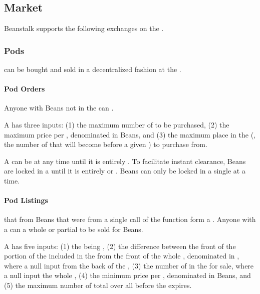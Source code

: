 \documentclass[class=article, crop=false]{standalone}
\begin{document}
\subsection{Market}
Beanstalk supports the following exchanges on the .

\subsubsection{Pods}
 can be bought and sold in a decentralized fashion at the  . 

\paragraph{Pod Orders}

Anyone with Beans not in the  can  . 

A  has three inputs: (1) the maximum number of  to be purchased, (2) the maximum price per , denominated in Beans, and (3) the maximum place in the  (, the number of  that will become  before a given ) to purchase from.

A  can be  at any time until it is entirely . To facilitate instant clearance, Beans are locked in a  until it is entirely  or . Beans can only be locked in a single  at a time.

\paragraph{Pod Listings}

 that  from Beans that were  from a single call of the  function form a . Anyone with a  can  a whole or partial  to be sold for Beans.

A  has five inputs: (1) the  being , (2) the difference between the front of the portion of the  included in the  from the front of the whole , denominated in , where a null input  from the back of the , (3) the number of  in the  for sale, where a null input  the whole , (4) the minimum price per , denominated in Beans, and (5) the maximum number of total   over all  before the  expires. 
\end{document}
